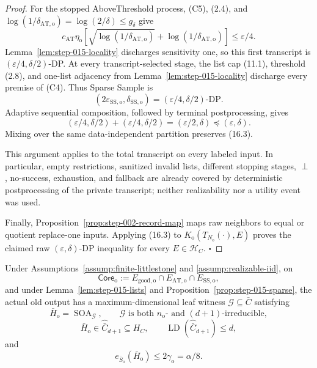 \begin{proof}
For the stopped AboveThreshold process, (C5), (2.4), and
\(\log(1/\delta_{\mathrm{AT,o}})=\log(2/\delta)\le g_\delta\) give
\[
c_{\mathrm{AT}}\eta_{\mathrm o}
[\sqrt{\log(1/\delta_{\mathrm{AT,o}})}
+\log(1/\delta_{\mathrm{AT,o}})]
\le\varepsilon/4.
\tag{16.1}
\]
Lemma~\ref{lem:step-015-locality} discharges sensitivity one, so this first
transcript is \((\varepsilon/4,\delta/2)\)-DP. At every transcript-selected
stage, the list cap (11.1), threshold (2.8), and one-list adjacency
from Lemma~\ref{lem:step-015-locality} discharge every premise of (C4).
Thus Sparse Sample is
\[
(2\varepsilon_{\mathrm{SS,o}},\delta_{\mathrm{SS,o}})
=(\varepsilon/4,\delta/2)\text{-DP}.
\tag{16.2}
\]
Adaptive sequential composition, followed by terminal postprocessing,
gives
\[
(\varepsilon/4,\delta/2)+(\varepsilon/4,\delta/2)
=(\varepsilon/2,\delta)\preceq(\varepsilon,\delta).
\tag{16.3}
\]
Mixing over the same data-independent partition preserves (16.3).

This argument applies to the total transcript on every labeled input.
In particular, empty restrictions, sanitized invalid lists, different
stopping stages, \(\perp\), no-success, exhaustion, and fallback are
already covered by deterministic postprocessing of the private transcript;
neither realizability nor a utility event was used.

Finally, Proposition~\ref{prop:step-002-record-map} maps raw
neighbors to equal or quotient replace-one inputs. Applying (16.3) to
\(K_{\mathrm o}(T_{N_{\mathrm o}}(\cdot),E)\) proves the claimed raw
\((\varepsilon,\delta)\)-DP inequality for every
\(E\in\mathcal H_C\). \(\square\)


\end{proof}

\begin{proposition}\label{prop:step-015-soa}
Under Assumptions~\ref{assump:finite-littlestone} and
\ref{assump:realizable-iid}, on
\[
\mathsf{Core}_{\mathrm o}:=
E_{\mathrm{good,o}}\cap E_{\mathrm{AT,o}}\cap E_{\mathrm{SS,o}},
\tag{17.1}
\]
and under Lemma~\ref{lem:step-015-lists} and
Proposition~\ref{prop:step-015-sparse}, the actual old output has a
maximum-dimensional leaf witness \(\mathcal G\subseteq\bar C\) satisfying
\[
\bar H_{\mathrm o}=\operatorname{SOA}_{\mathcal G},\qquad
\mathcal G\text{ is both }n_{\mathrm o}\text{- and }
(d+1)\text{-irreducible},
\tag{17.2}
\]
\[
\bar H_{\mathrm o}\in\widehat{\bar C}_{d+1}\subseteq H_C,\qquad
\operatorname{LD}(\widehat{\bar C}_{d+1})\le d,
\tag{17.3}
\]
and
\[
e_{\bar S_{\mathrm o}}(\bar H_{\mathrm o})
\le2\gamma_{\mathrm o}=\alpha/8.
\tag{17.4}
\]


\end{proposition}

